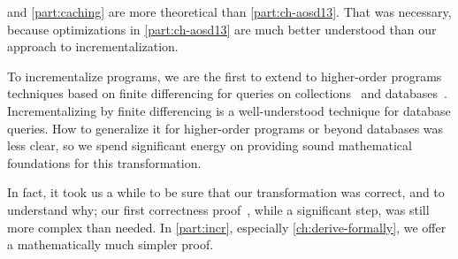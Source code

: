  and \cref{part:caching} are more theoretical than
\cref{part:ch-aosd13}. That was necessary, because optimizations in
\cref{part:ch-aosd13} are much better understood than our approach to
incrementalization.

To incrementalize programs, we are the first to extend to higher-order programs
techniques based on finite differencing for queries on
collections~\citep{Paige82FDC} and
databases~\citep{Blakeley:1986:EUM,Gupta99MMV}.
Incrementalizing by finite differencing is a well-understood technique for
database queries. How to generalize it for higher-order programs or beyond
databases was less clear, so we spend significant energy on providing sound
mathematical foundations for this transformation.

In fact, it took us a while to be sure that our transformation was correct, and
to understand why; our first correctness proof~\citep*{CaiEtAl2014ILC}, while a
significant step, was still more complex than needed. In \cref{part:incr},
especially \cref{ch:derive-formally}, we offer a mathematically much simpler
proof.


